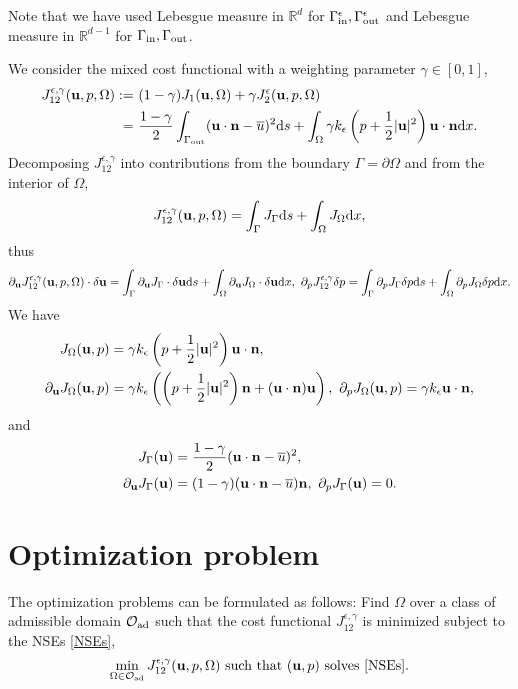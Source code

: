 \documentclass[oneside,11pt]{book}
\numberwithin{equation}{section}
\begin{document}
Note that we have used Lebesgue measure in $\mathbb{R}^d$ for $\Gamma_{\rm in}^\epsilon,\Gamma_{\rm out}^\epsilon$ and Lebesgue measure in $\mathbb{R}^{d-1}$ for $\Gamma_{\rm in},\Gamma_{\rm out}$.

We consider the mixed cost functional with a weighting parameter $\gamma\in[0,1]$,
\begin{align}
    J_{12}^{\epsilon,\gamma}({\bf u},p,\Omega) :=&\ (1 - \gamma)J_1({\bf u},\Omega) + \gamma J_2^\epsilon({\bf u},p,\Omega)\\
    =&\ \frac{1 - \gamma}{2}\int_{\Gamma_{\rm out}} ({\bf u}\cdot{\bf n} - \overline{u})^2{\rm d}s + \int_\Omega \gamma k_\epsilon\left(p + \frac{1}{2}|{\bf u}|^2\right){\bf u}\cdot{\bf n}{\rm d}x.
\end{align}
Decomposing $J_{12}^{\epsilon,\gamma}$ into contributions from the boundary $\Gamma = \partial\Omega$ and from the interior of $\Omega$,
\begin{align}
    J_{12}^{\epsilon,\gamma}({\bf u},p,\Omega) = \int_\Gamma J_\Gamma{\rm d}s + \int_\Omega J_\Omega{\rm d}x,
\end{align}
thus
\begin{align}
    \partial_{\bf u}J_{12}^{\epsilon,\gamma}({\bf u},p,\Omega)\cdot\delta{\bf u} = \int_\Gamma \partial_{\bf u}J_\Gamma\cdot\delta{\bf u}{\rm d}s + \int_\Omega \partial_{\bf u}J_\Omega\cdot\delta{\bf u}{\rm d}x,\ \partial_pJ_{12}^{\epsilon,\gamma}\delta p = \int_\Gamma \partial_pJ_\Gamma\delta p{\rm d}s + \int_\Omega \partial_pJ_\Omega\delta p{\rm d}x.
\end{align}
We have
\begin{align}
    J_\Omega({\bf u},p) &= \gamma k_\epsilon\left(p + \frac{1}{2}|{\bf u}|^2\right){\bf u}\cdot{\bf n},\\
    \partial_{\bf u}J_\Omega({\bf u},p) &= \gamma k_\epsilon\left(\left(p + \frac{1}{2}|{\bf u}|^2\right){\bf n} + ({\bf u}\cdot{\bf n}){\bf u}\right),\ \partial_pJ_\Omega({\bf u},p) = \gamma k_\epsilon{\bf u}\cdot{\bf n},
\end{align}
and
\begin{align}
    J_\Gamma({\bf u}) &= \frac{1 - \gamma}{2}({\bf u}\cdot{\bf n} - \overline{u})^2,\\
    \partial_{\bf u}J_\Gamma({\bf u}) &= (1 - \gamma)({\bf u}\cdot{\bf n} - \overline{u}){\bf n},\ \partial_pJ_\Gamma({\bf u}) = 0.
\end{align}

\section{Optimization problem}
The optimization problems can be formulated as follows: Find $\Omega$ over a class of admissible domain $\mathcal{O}_{\rm ad}$ such that the cost functional $J_{12}^{\epsilon,\gamma}$ is minimized subject to the NSEs \eqref{NSEs},
\begin{align}
    \label{SOP}
    \min_{\Omega\in\mathcal{O}_{\rm ad}} J_{12}^{\epsilon,\gamma}({\bf u},p,\Omega) \mbox{ such that } ({\bf u},p) \mbox{ solves \eqref{NSEs}}.
\end{align}
\end{document}
